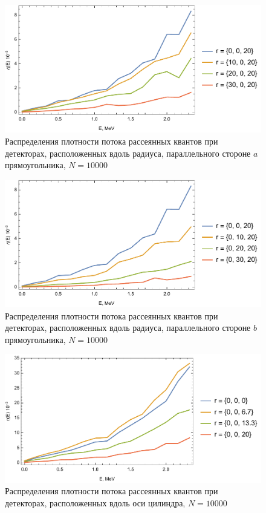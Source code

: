\documentclass[
11pt,
master, %
subf, %
href, %
colorlinks=true, %
]{disser}
\begin{document}
\begin{figure}[htbp]
  \centering
  \includegraphics[width=0.95\linewidth]{10k_2}
  \caption{Распределения плотности потока рассеянных
квантов при детекторах, расположенных вдоль радиуса, параллельного стороне $a$ прямоугольника, $N = 10000$}\label{}
\end{figure}

\newpage
\begin{figure}[htbp]
  \centering
  \includegraphics[width=0.95\linewidth]{10k_3}
  \caption{Распределения плотности потока рассеянных
квантов при детекторах, расположенных вдоль радиуса, параллельного стороне $b$ прямоугольника, $N = 10000$}\label{}
\end{figure}

\begin{figure}[htbp]
  \centering
  \includegraphics[width=0.95\linewidth]{10k_4}
  \caption{Распределения плотности потока рассеянных
квантов при детекторах, расположенных вдоль оси цилиндра, $N = 10000$}\label{}
\end{figure}
\end{document}
